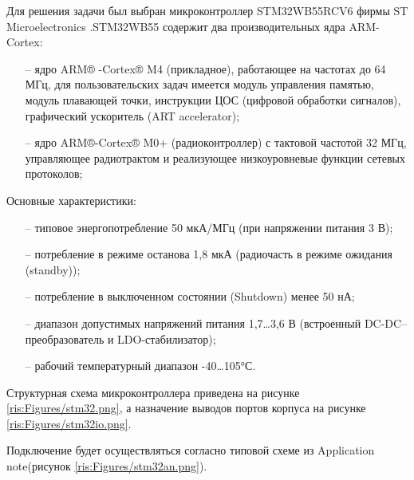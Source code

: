 \begin{sloppypar}
Для решения задачи был выбран микроконтроллер STM32WB55RCV6 фирмы ST Microelectronics \cite {STM}.STM32WB55 содержит два производительных ядра ARM-Cortex:
\begin{onehalfspace}
	\begin{itemize}
		\item[--] ядро ARM® -Cortex® M4 (прикладное), работающее на частотах до 64 МГц, для пользовательских задач имеется модуль управления памятью, модуль плавающей точки, инструкции ЦОС (цифровой обработки сигналов), графический ускоритель (ART accelerator);
		\item[--] ядро ARM®-Cortex® M0+ (радиоконтроллер) с тактовой частотой 32 МГц, управляющее радиотрактом и реализующее низкоуровневые функции сетевых протоколов;
	\end{itemize}
\end{onehalfspace}


Основные характеристики:
\begin{onehalfspace}
	\begin{itemize}
		\item[--] типовое энергопотребление 50 мкА/МГц (при напряжении питания 3 В);
		\item[--] потребление в режиме останова 1,8 мкА (радиочасть в режиме ожидания (standby));
		\item[--] потребление в выключенном состоянии (Shutdown) менее 50 нА;
		\item[--] диапазон допустимых напряжений питания 1,7…3,6 В (встроенный DC-DC–преобразователь и LDO-стабилизатор);
		\item[--] рабочий температурный диапазон -40…105°С.
	\end{itemize}
\end{onehalfspace}


Структурная схема микроконтроллера приведена на рисунке \ref{ris:Figures/stm32.png}, а назначение выводов портов корпуса на рисунке \ref{ris:Figures/stm32io.png}.





Подключение будет осуществляться согласно типовой схеме из Application note\cite {STM_an}(рисунок \ref{ris:Figures/stm32an.png}).






 




\end{sloppypar}
